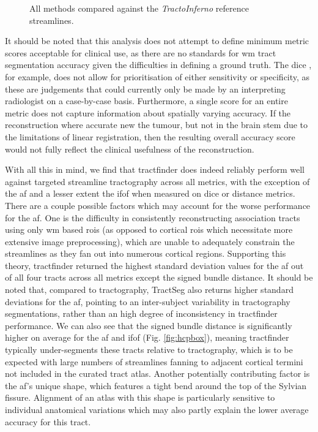 \documentclass[12pt,phd,a4paper,twoside]{ucl_thesis}
\providecommand{\DIFaddtex}[1]{{\protect\color{blue} \sf #1}} %
\providecommand{\DIFaddbegin}{} %
\providecommand{\DIFaddend}{} %
\providecommand{\DIFadd}[1]{\texorpdfstring{\DIFaddtex{#1}}{#1}} %
\newcommand{\DIFaddincludegraphics}[2][]{{\color{blue}\fbox{\DIFOincludegraphics[#1]{#2}}}} %
\DeclareRobustCommand{\DIFaddbegin}{\DIFOaddbegin \let\includegraphics\DIFaddincludegraphics} %
\DeclareRobustCommand{\DIFaddend}{\DIFOaddend \let\includegraphics\DIFOincludegraphics} %
\begin{document}
\begin{figure}[h!]
  \centering
  \caption[Comparison results with \textit{TractoInferno} reference streamlines]{All methods compared against the \textit{TractoInferno} reference streamlines. }
  \label{fig:combobox}
\end{figure}

\DIFaddbegin \DIFadd{It should be noted that this analysis does not attempt to define minimum metric scores acceptable for clinical use, as there are no standards for }\gls{wm} \DIFadd{tract segmentation accuracy given the difficulties in defining a ground truth.
The }\gls{dice}\DIFadd{, for example, does not allow for prioritisation of either sensitivity or specificity, as these are judgements that could currently only be made by an interpreting radiologist on a case-by-case basis.
Furthermore, a single score for an entire metric does not capture information about spatially varying accuracy.
If the reconstruction where accurate new the tumour, but not in the brain stem due to the limitations of linear registration, then the resulting overall accuracy score would not fully reflect the clinical usefulness of the reconstruction.
}

\DIFaddend With all this in mind, we find that tractfinder does indeed reliably perform well against targeted streamline tractography across all metrics, with the exception of the \gls{af} and a lesser extent the \gls{ifof} when measured on \gls{dice} or distance metrics.
There are a couple possible factors which may account for the worse performance for the \gls{af}.
One is the difficulty in consistently reconstructing association tracts using only \gls{wm} based \glspl{roi} (as opposed to cortical \glspl{roi} which necessitate more extensive image preprocessing), which are unable to adequately constrain the streamlines as they fan out into numerous cortical regions.
Supporting this theory, tractfinder returned the highest standard deviation values for the \gls{af} out of all four tracts across all metrics except the signed bundle distance.
It should be noted that, compared to tractography, TractSeg also returns higher standard deviations for the \gls{af}, pointing to an inter-subject variability in tractography segmentations, rather than an high degree of inconsistency in tractfinder performance.
We can also see that the signed bundle distance is significantly higher on average for the \gls{af} and \gls{ifof} (Fig. \ref{fig:hcpbox}), meaning tractfinder typically under-segments these tracts relative to tractography, which is to be expected with large numbers of streamlines fanning to adjacent cortical termini not included in the curated tract atlas.
Another potentially contributing factor is the \gls{af}'s unique shape, which features a tight bend around the top of the Sylvian fissure.
Alignment of an atlas with this shape is particularly sensitive to individual anatomical variations which may also partly explain the lower average accuracy for this tract.
\end{document}
